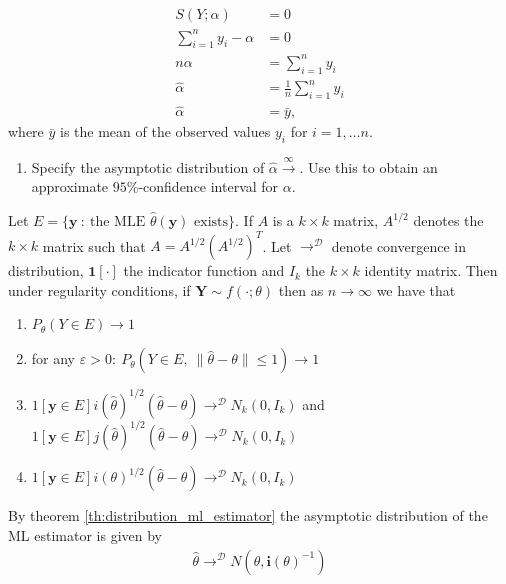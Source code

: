 \begin{align*}
    S\left(Y; \alpha \right) &= 0\\
    \sum_{i=1}^n y_i - \alpha &= 0\\
    n\alpha &= \sum_{i=1}^n y_i\\
    \hat{\alpha} &= \frac{1}{n} \sum_{i=1}^n y_i \\
    \hat{\alpha} &= \bar{y},
\end{align*}
where $\bar{y}$ is the mean of the observed values $y_i$ for $i = 1, \ldots n$.

\begin{enumerate}[resume]
    \item  Specify the asymptotic distribution of $\hat{\alpha}\xrightarrow{\infty}$. Use this to obtain an approximate $95\%$-confidence interval for $\alpha$.
\end{enumerate}

\begin{theorem}\label{th:distribution_ml_estimator}
Let $E = \{\mathbf{y} \ : \ \text{the MLE } \hat{\theta}(\mathbf{y}) \text{ exists}\}$. 
If $A$ is a $k \times k$ matrix, $A^{1/2}$ denotes the $k \times k$ matrix such that $A = A^{1/2}\left( A^{1/2} \right)^T$.
Let $\rightarrow^\mathcal{D}$ denote convergence in distribution, $\mathbf{1}[\cdot]$ the indicator function and $I_k$ the $k \times k$ identity matrix.
Then under regularity conditions, if $\mathbf{Y} \sim f(\cdot;\theta)$ then as $n \rightarrow \infty$ we have that
\begin{enumerate}
    \item $P_\theta(Y \in E) \rightarrow 1$
    \item for any $\varepsilon > 0: \ P_\theta(Y \in E, \ \|\hat{\theta} - \theta\| \leq 1) \rightarrow 1$
    \item $1[\mathbf{y} \in E] i(\hat{\theta})^{1/2}(\hat{\theta} - \theta) \rightarrow^\mathcal{D} N_k(0, I_k)$ and $1[\mathbf{y} \in E] j(\hat{\theta})^{1/2}(\hat{\theta} - \theta) \rightarrow^\mathcal{D} N_k(0, I_k)$
    \item $1[\mathbf{y} \in E] i(\theta)^{1/2}(\hat{\theta} - \theta) \rightarrow^\mathcal{D} N_k(0, I_k)$
\end{enumerate}
\end{theorem}


By theorem \ref{th:distribution_ml_estimator} the asymptotic distribution of the ML estimator is given by
\begin{align*}
    \hat{\theta} \rightarrow^\mathcal{D} N\left( \theta, \boldsymbol{i}(\theta)^{-1} \right)
\end{align*}

